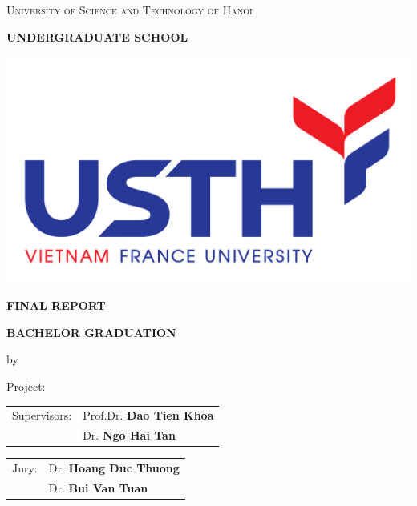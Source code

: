 \documentclass[a4paper,12pt]{article}
\theoremstyle{plain}\newtheorem{ques}{Question}
\theoremstyle{definition}\newtheorem*{ans}{Answer}
\begin{document}
        \begin{boxedminipage}[t]{14.8cm}
            \thispagestyle{empty}
            \centering
            {\scshape\large University of Science and Technology of Hanoi \par}
            {\large\bfseries \MakeUppercase{Undergraduate School} \par}
            \vspace{0.5cm}
            {\includegraphics[scale=0.08,valign=c]{logo/USTH_logo.png}\par}
            \vspace{0.5cm}
            {\Large\bfseries\MakeUppercase{Final Report}\par}
            {\LARGE\bfseries\MakeUppercase{Bachelor Graduation}\par}
            \vspace{0.4cm}
            {\large by\par}
            \vspace{0.3cm}
            {\Large\bfseries \theauthor\par}
            \vspace{1.5cm}
            {\Large Project:\par}
            {\LARGE \MakeUppercase{\thetitle}\par}
            \vspace{2cm}
            {\Large
            \begin{tabular}{p{3cm} p{7cm}}
                Supervisors: & Prof.Dr. \textbf{Dao Tien Khoa}\\
                             & Dr. \textbf{Ngo Hai Tan}
            \end{tabular}\par
            }
            \vspace{1cm}
            {\Large
            \begin{tabular}{p{3cm} p{7cm}}
                Jury: & Dr. \textbf{Hoang Duc Thuong}\\
                      & Dr. \textbf{Bui Van Tuan}
            \end{tabular}\par
            }
            \vspace{1.5cm}
            {\large\par}
        \end{boxedminipage}
        
\end{document}
